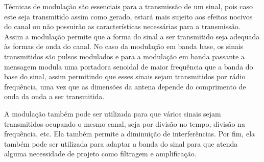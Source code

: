 Técnicas de modulação são essenciais para a transmissão de um sinal, pois caso este seja transmitido assim como gerado, estará mais sujeito aos efeitos nocivos do canal ou não possuirão as características necessárias para a transmissão. Assim a modulação permite que a forma do sinal a ser transmitido seja adequada às formas de onda do canal. No caso da modulação em banda base, os sinais transmitidos são pulsos modulados e para a modulação em banda passante a mensagem modula uma portadora senoidal de maior frequência que a banda do base do sinal, assim permitindo que esses sinais sejam transmitidos por rádio frequência, uma vez que as dimensões da antena depende do comprimento de onda da onda a ser transmitida.

A modulação também pode ser utilizada para que vários sinais sejam transmitidos ocupando o mesmo canal, seja por divisão no tempo, divisão na frequência, etc. Ela também permite a diminuição de interferências. Por fim, ela também pode ser utilizada para adaptar a banda do sinal para que atenda alguma necessidade de projeto como filtragem e amplificação.